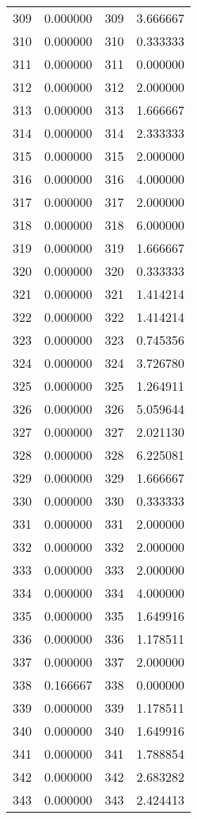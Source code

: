 \documentclass[12pt]{article}
\begin{document}
\begin{longtable}{@{}cccc@{}}
309 & 0.000000 & 309 & 3.666667 \\
310 & 0.000000 & 310 & 0.333333 \\
311 & 0.000000 & 311 & 0.000000 \\
312 & 0.000000 & 312 & 2.000000 \\
313 & 0.000000 & 313 & 1.666667 \\
314 & 0.000000 & 314 & 2.333333 \\
315 & 0.000000 & 315 & 2.000000 \\
316 & 0.000000 & 316 & 4.000000 \\
317 & 0.000000 & 317 & 2.000000 \\
318 & 0.000000 & 318 & 6.000000 \\
319 & 0.000000 & 319 & 1.666667 \\
320 & 0.000000 & 320 & 0.333333 \\
321 & 0.000000 & 321 & 1.414214 \\
322 & 0.000000 & 322 & 1.414214 \\
323 & 0.000000 & 323 & 0.745356 \\
324 & 0.000000 & 324 & 3.726780 \\
325 & 0.000000 & 325 & 1.264911 \\
326 & 0.000000 & 326 & 5.059644 \\
327 & 0.000000 & 327 & 2.021130 \\
328 & 0.000000 & 328 & 6.225081 \\
329 & 0.000000 & 329 & 1.666667 \\
330 & 0.000000 & 330 & 0.333333 \\
331 & 0.000000 & 331 & 2.000000 \\
332 & 0.000000 & 332 & 2.000000 \\
333 & 0.000000 & 333 & 2.000000 \\
334 & 0.000000 & 334 & 4.000000 \\
335 & 0.000000 & 335 & 1.649916 \\
336 & 0.000000 & 336 & 1.178511 \\
337 & 0.000000 & 337 & 2.000000 \\
338 & 0.166667 & 338 & 0.000000 \\
339 & 0.000000 & 339 & 1.178511 \\
340 & 0.000000 & 340 & 1.649916 \\
341 & 0.000000 & 341 & 1.788854 \\
342 & 0.000000 & 342 & 2.683282 \\
343 & 0.000000 & 343 & 2.424413 \\

\end{longtable}
\end{document}

